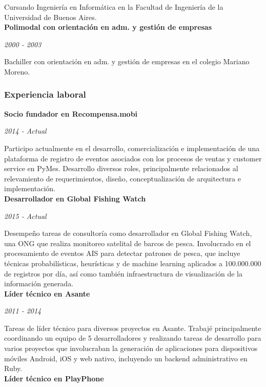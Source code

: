 \documentclass[a4paper,11pt]{article}
\begin{document}
\noindent Cursando Ingeniería en Informática en la Facultad de Ingeniería de la
Universidad de Buenos Aires. \\

\noindent \textbf{Polimodal con orientación en adm. y gestión de empresas}

\noindent\emph{2000 - 2003}

\noindent Bachiller con orientación en adm. y gestión de empresas en el colegio
Mariano Moreno.

\subsubsection{Experiencia laboral}

\noindent \textbf{Socio fundador en Recompensa.mobi}

\noindent \emph{2014 - Actual}

\noindent Participo actualmente en el desarrollo, comercialización e
implementación de una plataforma de registro de eventos asociados con los
procesos de ventas y customer service en PyMes. Desarrollo diversos roles,
principalmente relacionados al relevamiento de requerimientos, diseño,
conceptualización de arquitectura e implementación. \\

\noindent \textbf{Desarrollador en Global Fishing Watch}

\noindent \emph{2015 - Actual}

\noindent Desempeño tareas de consultoría como desarrollador en Global Fishing
Watch, una ONG que realiza monitoreo satelital de barcos de pesca. Involucrado
en el procesamiento de eventos AIS para detectar patrones de pesca, que incluye
técnicas probabilísticas, heurísticas y de machine learning aplicados a
100.000.000 de registros por día, así como también infraestructura de
visualización de la información generada. \\

\noindent \textbf{Líder técnico en Asante}

\noindent \emph{2011 - 2014}

\noindent Tareas de líder técnico para diversos proyectos en Asante. Trabajé
principalmente coordinando un equipo de 5 desarrolladores y realizando tareas
de desarrollo para varios proyectos que involucraban la generación de
aplicaciones para dispositivos móviles Android, iOS y web nativo, incluyendo un
backend administrativo en Ruby. \\

\noindent \textbf{Líder técnico en PlayPhone}
\end{document}
